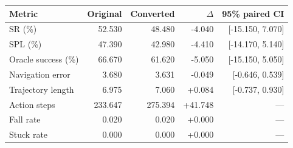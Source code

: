 \begin{tabular}{lrrrr}
\toprule
Metric & Original & Converted & $\Delta$ & 95\% paired CI \\
\midrule
SR (\%) & 52.530 & 48.480 & -4.040 & [-15.150, 7.070] \\
SPL (\%) & 47.390 & 42.980 & -4.410 & [-14.170, 5.140] \\
Oracle success (\%) & 66.670 & 61.620 & -5.050 & [-15.150, 5.050] \\
Navigation error & 3.680 & 3.631 & -0.049 & [-0.646, 0.539] \\
Trajectory length & 6.975 & 7.060 & +0.084 & [-0.737, 0.930] \\
Action steps & 233.647 & 275.394 & +41.748 & --- \\
Fall rate & 0.020 & 0.020 & +0.000 & --- \\
Stuck rate & 0.000 & 0.000 & +0.000 & --- \\
\bottomrule
\end{tabular}
